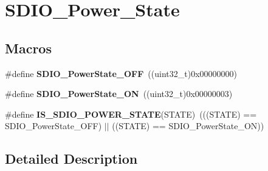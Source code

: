 \hypertarget{group___s_d_i_o___power___state}{\section{S\-D\-I\-O\-\_\-\-Power\-\_\-\-State}
\label{group___s_d_i_o___power___state}
}
\subsection*{Macros}
\begin{DoxyCompactItemize}
\item 
\hypertarget{group___s_d_i_o___power___state_gab2f36a68fc50795ea74a7e98b4ac2d37}{\#define {\bfseries S\-D\-I\-O\-\_\-\-Power\-State\-\_\-\-O\-F\-F}~((uint32\-\_\-t)0x00000000)}\label{group___s_d_i_o___power___state_gab2f36a68fc50795ea74a7e98b4ac2d37}

\item 
\hypertarget{group___s_d_i_o___power___state_ga0aacd8c94effe8066c6d447fc884d217}{\#define {\bfseries S\-D\-I\-O\-\_\-\-Power\-State\-\_\-\-O\-N}~((uint32\-\_\-t)0x00000003)}\label{group___s_d_i_o___power___state_ga0aacd8c94effe8066c6d447fc884d217}

\item 
\hypertarget{group___s_d_i_o___power___state_gad0dae767c2024de1769efb1feccc14ef}{\#define {\bfseries I\-S\-\_\-\-S\-D\-I\-O\-\_\-\-P\-O\-W\-E\-R\-\_\-\-S\-T\-A\-T\-E}(S\-T\-A\-T\-E)~(((S\-T\-A\-T\-E) == S\-D\-I\-O\-\_\-\-Power\-State\-\_\-\-O\-F\-F) $|$$|$ ((S\-T\-A\-T\-E) == S\-D\-I\-O\-\_\-\-Power\-State\-\_\-\-O\-N))}\label{group___s_d_i_o___power___state_gad0dae767c2024de1769efb1feccc14ef}

\end{DoxyCompactItemize}


\subsection{Detailed Description}
